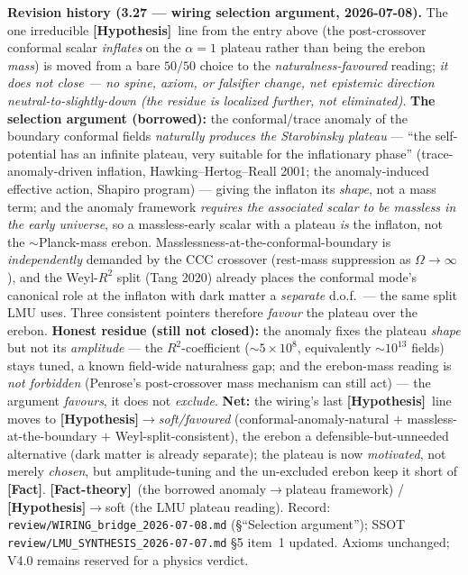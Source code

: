 \documentclass[11pt]{article}
\newcommand{\Fact}{\textbf{\textcolor{green!45!black}{[Fact]}}}
\newcommand{\factth}{\textcolor{green!40!black}{\textbf{[Fact-theory]}}}
\newcommand{\hyp}{\textcolor{orange!80!black}{\textbf{[Hypothesis]}}}
\begin{document}
{\smallskip\noindent\textbf{Revision history (3.27 --- wiring selection argument, 2026-07-08).} The one irreducible \hyp\ line from the entry above (the post-crossover conformal scalar \emph{inflates} on the $\alpha{=}1$ plateau rather than being the erebon \emph{mass}) is moved from a bare $50/50$ choice to the \emph{naturalness-favoured} reading; \emph{it does not close --- no spine, axiom, or falsifier change, net epistemic direction neutral-to-slightly-down (the residue is localized further, not eliminated)}. \textbf{The selection argument (borrowed):} the conformal/trace anomaly of the boundary conformal fields \emph{naturally produces the Starobinsky plateau} --- ``the self-potential has an infinite plateau, very suitable for the inflationary phase'' (trace-anomaly-driven inflation, Hawking--Hertog--Reall 2001; the anomaly-induced effective action, Shapiro program) --- giving the inflaton its \emph{shape}, not a mass term; and the anomaly framework \emph{requires the associated scalar to be massless in the early universe}, so a massless-early scalar with a plateau \emph{is} the inflaton, not the $\sim$Planck-mass erebon. Masslessness-at-the-conformal-boundary is \emph{independently} demanded by the CCC crossover (rest-mass suppression as $\Omega\to\infty$), and the Weyl-$R^2$ split (Tang 2020) already places the conformal mode's canonical role at the inflaton with dark matter a \emph{separate} d.o.f.\ --- the same split LMU uses. Three consistent pointers therefore \emph{favour} the plateau over the erebon. \textbf{Honest residue (still not closed):} the anomaly fixes the plateau \emph{shape} but not its \emph{amplitude} --- the $R^2$-coefficient ($\sim$$5\times10^8$, equivalently $\sim$$10^{13}$ fields) stays tuned, a known field-wide naturalness gap; and the erebon-mass reading is \emph{not forbidden} (Penrose's post-crossover mass mechanism can still act) --- the argument \emph{favours}, it does not \emph{exclude}. \textbf{Net:} the wiring's last \hyp\ line moves to \hyp$\to$\emph{soft/favoured} (conformal-anomaly-natural $+$ massless-at-the-boundary $+$ Weyl-split-consistent), the erebon a defensible-but-unneeded alternative (dark matter is already separate); the plateau is now \emph{motivated}, not merely \emph{chosen}, but amplitude-tuning and the un-excluded erebon keep it short of \Fact. \factth\ (the borrowed anomaly$\to$plateau framework) / \hyp$\to$soft (the LMU plateau reading). Record: \texttt{review/WIRING\_bridge\_2026-07-08.md} (\S``Selection argument''); SSOT \texttt{review/LMU\_SYNTHESIS\_2026-07-07.md} \S5 item~1 updated. Axioms unchanged; V4.0 remains reserved for a physics verdict.

}
\end{document}
